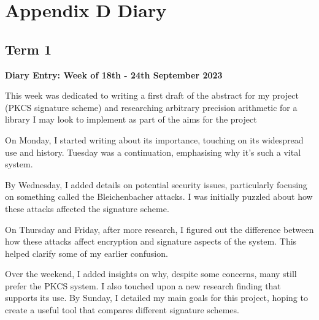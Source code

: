 \documentclass[]{final_report}
\theoremstyle{definition}
\begin{document}

\chapter{Appendix D Diary}

\section{Term 1}

\textbf{Diary Entry: Week of 18th - 24th September 2023}

This week was dedicated to writing a first draft of the abstract for my project (PKCS signature scheme) and researching arbitrary precision arithmetic for a library I may look to implement as part of the aims for the project

On Monday, I started writing about its importance, touching on its widespread use and history.
Tuesday was a continuation, emphasising why it's such a vital system.

By Wednesday, I added details on potential security issues, particularly focusing on something
called the Bleichenbacher attacks. I was initially puzzled about how these attacks affected the
signature scheme.

On Thursday and Friday, after more research, I figured out the difference between how these attacks
affect encryption and signature aspects of the system. This helped clarify some of my earlier
confusion.

Over the weekend, I added insights on why, despite some concerns, many still prefer the PKCS system.
I also touched upon a new research finding that supports its use. By Sunday, I detailed my main
goals for this project, hoping to create a useful tool that compares different signature schemes.
\end{document}
